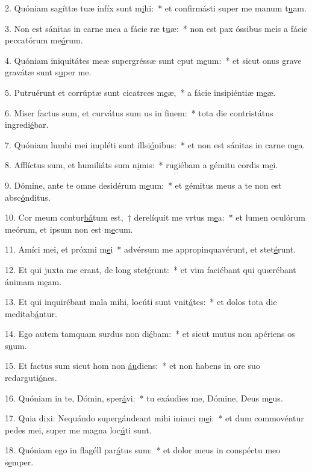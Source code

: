 2. Quóniam sagíttæ tuæ infíx sunt m\uline{i}hi:~* et confirmásti super me manum t\uline{u}am.\par 
3. Non est sánitas in carne mea a fácie ræ t\uline{u}æ:~* non est pax óssibus meis a fácie peccatórum me\uline{ó}rum.\par 
4. Quóniam iniquitátes meæ supergréssæ sunt cput m\uline{e}um:~* et sicut onus grave gravátæ sunt s\uline{u}per me.\par 
5. Putruérunt et corrúptæ sunt cicatrces m\uline{e}æ,~* a fácie insipiéntiæ m\uline{e}æ.\par 
6. Miser factus sum, et curvátus sum us in f\uline{i}nem:~* tota die contristátus ingredi\uline{é}bar.\par 
7. Quóniam lumbi mei impléti sunt illsi\uline{ó}nibus:~* et non est sánitas in carne m\uline{e}a.\par 
8. Afflíctus sum, et humiliáts sum n\uline{i}mis:~* rugiébam a gémitu cordis m\uline{e}i.\par 
9. Dómine, ante te omne desidérum m\uline{e}um:~* et gémitus meus a te non est absc\uline{ó}nditus.\par 
10. Cor meum contur\uline{bá}tum est,~† derelíquit me vrtus m\uline{e}a:~* et lumen oculórum meórum, et ipsum non est m\uline{e}cum.\par 
11. Amíci mei, et próxmi m\uline{e}i~* advérsum me appropinquavérunt, et stet\uline{é}runt.\par 
12. Et qui juxta me erant, de long stet\uline{é}runt:~* et vim faciébant qui quærébant ánimam m\uline{e}am.\par 
13. Et qui inquirébant mala mihi, locúti sunt vnit\uline{á}tes:~* et dolos tota die meditab\uline{á}ntur.\par 
14. Ego autem tamquam surdus non di\uline{é}bam:~* et sicut mutus non apériens os s\uline{u}um.\par 
15. Et factus sum sicut hom non \uline{áu}diens:~* et non habens in ore suo redarguti\uline{ó}nes.\par 
16. Quóniam in te, Dómin, sper\uline{á}vi:~* tu exáudies me, Dómine, Deus m\uline{e}us.\par 
17. Quia dixi: Nequándo supergáudeant mihi inimci m\uline{e}i:~* et dum commovéntur pedes mei, super me magna loc\uline{ú}ti sunt.\par 
18. Quóniam ego in flagéll par\uline{á}tus sum:~* et dolor meus in conspéctu meo s\uline{e}mper.\par 
